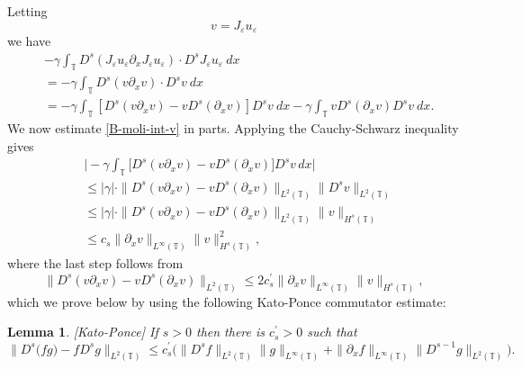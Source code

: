 \documentclass[12pt,reqno]{amsart}
\newcommand{\p}{\partial}
\newcommand{\ci}{\mathbb{T}}
\newcommand{\ee}{\varepsilon}
\theoremstyle{plain}  %
\newtheorem{lemma}{Lemma}
\theoremstyle{definition}
\begin{document}
\begin{appendices}
%
%
%
\noindent
Letting 
%
\begin{equation} 
	\label{v-Je-ue}
	v=J_\ee u_\ee
\end{equation}
%
%
we have
%
\begin{equation} 
	\begin{split}
		\label{B-moli-int-v}
		& -  \gamma \int_{\ci}   D^s (J_{\ee} u_{\ee} \p_x J_\ee u_\ee)
		 \cdot D^s
		J_{\ee}u_\ee \ dx  
		\\
		& = - \gamma \int_\ci
		 D^s(v \partial_x v) \cdot   D^s v \ dx
		\\
		& = - \gamma \int_\ci
		\left [ 
		D^s(v\p_x v)  -  v D^s (\p_xv)
		\right ] 
		D^s v \ dx - \gamma \int_\ci
		v D^s (\p_xv)
		D^s v \ dx.
	\end{split}
\end{equation}
%
%
%
We now estimate \eqref{B-moli-int-v} in parts. Applying the Cauchy-Schwarz inequality gives
%
\begin{equation} 
	\label{int1-est-calc2}
	\begin{split}
		& \Big|
		- \gamma \int_\ci
		\big[ 
		D^s(v\p_x v)  -  v D^s (\p_xv)
		\big]
		D^s v   \, dx
		\Big|
		\\
		& \le
		|\gamma| \cdot \|
		D^s(v\p_x v)  -  v D^s (\p_xv)
		\|_{L^2(\ci)}
		\|
		D^s v 
		\|_{L^2(\ci)}
		\\
		&\le
		|\gamma| \cdot \|
		D^s(v\p_x v)  -  v D^s (\p_xv)
		\|_{L^2(\ci)}
		\|
		v
		\|_{H^s(\ci)}
		\\
		&\le c_s \| \p_x v \|_{L^\infty(\ci)} 
		\| v \|_{H^s(\ci)}^2,
	\end{split}
\end{equation}
%
where the last step follows from 
%
\begin{equation} 
	\label{int1-est-calc3}
	\| D^s(v\p_x v)  -  v D^s (\p_xv) \|_{L^2(\ci)}
	\le
	2 c_s^{\prime}    \| \p_x v \|_{L^\infty(\ci)} 
	\| v \|_{H^s(\ci)},
\end{equation}
which we prove below by using the following Kato-Ponce commutator 
estimate:  
\begin{lemma} 
	\label{KP-lemma}
	[Kato-Ponce]
	If  $s>0$ then there is $c_s^{\prime}>0$ such that 
	\begin{equation} 
		\label{KP-com-est}
		\| D^{s} \big(fg) -  f D^s g\|_{L^2(\ci)}
		\le
		c_s^{\prime}\big(
		\| D^{s}f \|_{L^2(\ci)}    \| g \|_{L^\infty(\ci)} 
		+
		\| \p_xf \|_{L^\infty(\ci)}    \| D^{s-1}g \|_{L^2(\ci)}   
		\big).
	\end{equation}
	\end{lemma}

\end{appendices}
\end{document}
